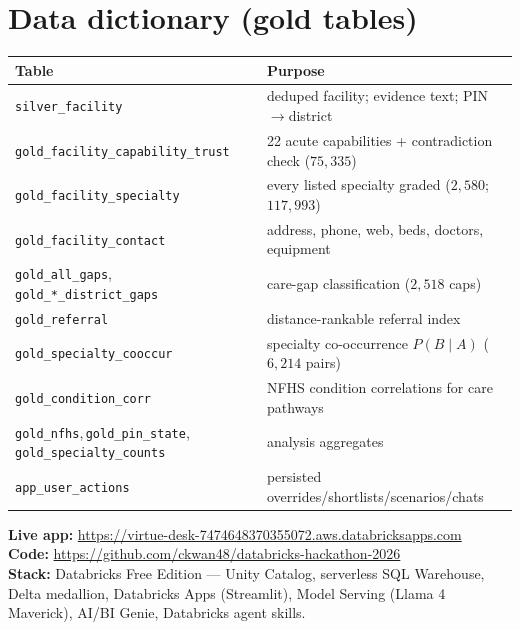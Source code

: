 \documentclass[11pt]{article}
\begin{document}
\section{Data dictionary (gold tables)}
\small
\begin{tabular}{ll}
\toprule
Table & Purpose\\
\midrule
\texttt{silver\_facility} & deduped facility; evidence text; PIN$\to$district\\
\texttt{gold\_facility\_capability\_trust} & 22 acute capabilities + contradiction check ($75{,}335$)\\
\texttt{gold\_facility\_specialty} & every listed specialty graded ($2{,}580$; $117{,}993$)\\
\texttt{gold\_facility\_contact} & address, phone, web, beds, doctors, equipment\\
\texttt{gold\_all\_gaps},\,\texttt{gold\_*\_district\_gaps} & care-gap classification ($2{,}518$ caps)\\
\texttt{gold\_referral} & distance-rankable referral index\\
\texttt{gold\_specialty\_cooccur} & specialty co-occurrence $P(B\mid A)$ ($6{,}214$ pairs)\\
\texttt{gold\_condition\_corr} & NFHS condition correlations for care pathways\\
\texttt{gold\_nfhs},\,\texttt{gold\_pin\_state},\,\texttt{gold\_specialty\_counts} & analysis aggregates\\
\texttt{app\_user\_actions} & persisted overrides/shortlists/scenarios/chats\\
\bottomrule
\end{tabular}

\vspace{6pt}
\noindent\textbf{Live app:} \url{https://virtue-desk-7474648370355072.aws.databricksapps.com}\\
\textbf{Code:} \url{https://github.com/ckwan48/databricks-hackathon-2026}\\
\textbf{Stack:} Databricks Free Edition --- Unity Catalog, serverless SQL Warehouse, Delta medallion, Databricks Apps (Streamlit), Model Serving (Llama 4 Maverick), AI/BI Genie, Databricks agent skills.
\end{document}
